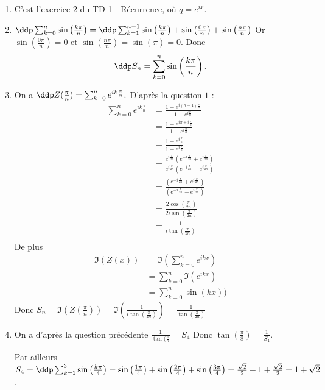 \documentclass[a4paper, 11pt,reqno]{article}
\begin{document}
\begin{correction}
\begin{enumerate}
\item C'est l'exercice 2 du TD 1 - Récurrence, où $q=e^{ix}$. 
\item $\ddp \sum_{k=0}^{n} \sin \left( \frac{k\pi}{n}\right) =  \ddp \sum_{k=1}^{n-1} \sin \left( \frac{k\pi}{n}\right)  + \sin\left( \frac{0\pi}{n}\right) + \sin\left( \frac{n\pi}{n}\right) $
Or $ \sin\left( \frac{0\pi}{n}\right)=0$ et $ \sin\left( \frac{n\pi}{n}\right)=\sin(\pi)=0 $. Donc 
$$\ddp S_n = \sum_{k=0}^{n} \sin \left( \frac{k\pi}{n}\right).$$
\item  On a $\ddp Z(\frac{\pi}{n})= \sum_{k=0}^n e^{ik\frac{\pi}{n}}.$ D'après la question $1$ : 
\begin{align*}
\sum_{k=0}^n e^{ik\frac{\pi}{n}}&= \frac{1-e^{i(n+1)\frac{\pi}{n}}}{1-e^{i\frac{\pi}{n}}}\\
												&=\frac{1-e^{i\pi +i\frac{\pi}{n}}}{1-e^{i\frac{\pi}{n}}}\\
												&=\frac{1+e^{i\frac{\pi}{n}}}{1-e^{i\frac{\pi}{n}}}\\
												&=\frac{e^{i\frac{\pi}{2n}}  \left(e^{-i\frac{\pi}{2n}}+e^{i\frac{\pi}{2n}}\right)  }{   e^{i\frac{\pi}{2n}}  \left(e^{-i\frac{\pi}{2n}}-e^{i\frac{\pi}{2n}}\right)  }\\
											&=\frac{  \left(e^{-i\frac{\pi}{2n}}+e^{i\frac{\pi}{2n}}\right)  }{     \left(e^{-i\frac{\pi}{2n}}-e^{i\frac{\pi}{2n}}\right)  }\\
										&=\frac{ 2\cos(\frac{\pi}{2n} ) }{  2i \sin(\frac{\pi}{2n})} \\
										&=\frac{ 1  }{  i \tan(\frac{\pi}{2n})} \\										
\end{align*}
De plus 
\begin{align*}
\Im(Z(x))&= \Im\left(\sum_{k=0}^n e^{ikx}\right)\\
							&=\sum_{k=0}^n \Im(e^{ikx})\\
							&=\sum_{k=0}^n \sin(kx))
\end{align*}
Donc $S_n= \Im( Z(\frac{\pi}{n})) = \Im(\frac{ 1  }{  i \tan(\frac{\pi}{2n})}) =\frac{ 1  }{  \tan(\frac{\pi}{2n})}$

\item On a d'après la question précédente $\frac{1}{\tan(\frac{\pi}{8}}= S_4$
Donc $\tan(\frac{\pi}{8})= \frac{1}{S_4}$.

Par ailleurs $S_4=\ddp \sum_{k=1}^{3} \sin \left( \frac{k\pi}{4}\right) =  \sin \left( \frac{1\pi}{4}\right)+ \sin \left( \frac{2\pi}{4}\right)+ \sin \left( \frac{3\pi}{4}\right) = \frac{\sqrt{2}}{2}+1+\frac{\sqrt{2}}{2}=1+\sqrt{2}$.


\end{enumerate}
\end{correction}
\end{document}
